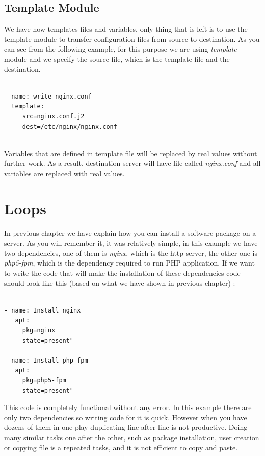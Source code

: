 \documentclass[10pt]{book}
\begin{document}
\subsection{Template Module}
We have now templates files and variables, only thing that is left is to use the 
template module to transfer configuration files from source to destination. As 
you can see from the following example, for this purpose we are using \emph{template} 
module and we specify the source file, which is the template file and the 
destination. 

\begin{verbatim}

- name: write nginx.conf
  template: 
     src=nginx.conf.j2
     dest=/etc/nginx/nginx.conf
         
\end{verbatim}

Variables that are defined in template file will be replaced by real values 
without further work. As a result, destination server will have file called 
\emph{nginx.conf} and all variables are replaced with real values.


\section{Loops}
In previous chapter we have explain how you can install a software package on a 
server. As you will remember it, it was relatively simple, in this example we have two dependencies, one 
of them is \emph{nginx}, which is the http server, the other one is \emph{php5-fpm}, which is the dependency
required to run PHP application. If we want to write the code that will make the installation of these 
dependencies code should look like this (based on what we 
have shown in previous chapter) :

\begin{Verbatim} 

- name: Install nginx  
   apt:
     pkg=nginx 
     state=present"

- name: Install php-fpm 
   apt:
     pkg=php5-fpm
     state=present"

\end{Verbatim}

This code is completely functional without any error. In this example there are 
only two dependencies so writing code for it is quick. However when you have dozens of 
them in one play duplicating line after line is not productive. Doing many 
similar tasks one after the other, such as package installation, user creation 
or copying file is a repeated tasks, and it is not efficient to copy and paste.
\end{document}

